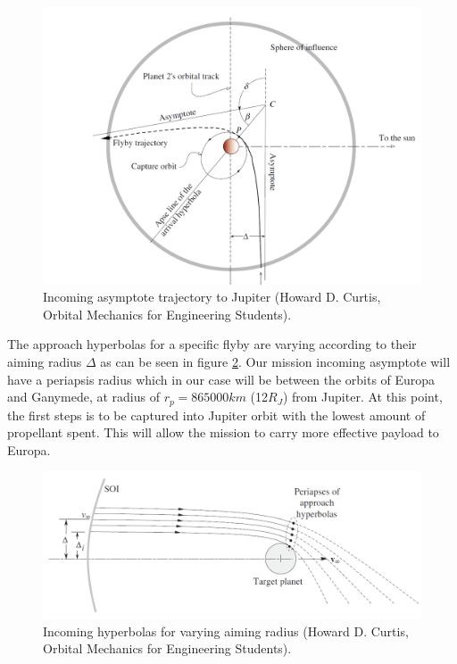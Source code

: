 \begin{figure}[h!]
\centering
\includegraphics[scale=0.3]{figures/Orbiter/capture.png}
\caption{Incoming asymptote trajectory to Jupiter (Howard D. Curtis, Orbital Mechanics for Engineering Students).\cite{orbitals}}
\label{fig:capture}
\end{figure}

The approach hyperbolas for a specific flyby are varying according to their aiming radius $\Delta$ as can be seen in figure \ref{fig:joihyp}. Our mission incoming asymptote will have a periapsis radius which in our case will be between the orbits of Europa and Ganymede, at radius of $r_p=865000km$ (12$R_J$) from Jupiter. At this point, the first steps is to be captured into Jupiter orbit with the lowest amount of propellant spent. This will allow the mission to carry more effective payload to Europa. 

\begin{figure}[h!]
\centering
\includegraphics[scale=0.3]{figures/Orbiter/joihyp.png}
\caption{Incoming hyperbolas for varying aiming radius (Howard D. Curtis, Orbital Mechanics for Engineering Students).\cite{orbitals}}
\label{fig:joihyp}
\end{figure}

